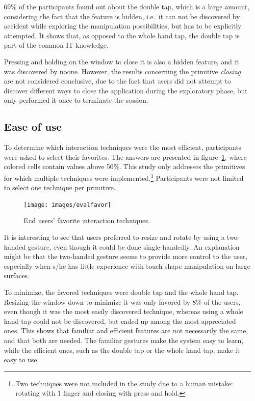 69\% of the participants found out about the double tap, which is a large amount, considering the fact that the feature is hidden, i.e.\ it can not be discovered by accident while exploring the manipulation possibilities, but has to be explicitly attempted.
It shows that, as opposed to the whole hand tap, the double tap is part of the common IT knowledge.

Pressing and holding on the window to close it is also a hidden feature, and it was discovered by noone.
However, the results concerning the primitive \emph{closing} are not considered conclusive, due to the fact that users did not attempt to discover different ways to close the application during the exploratory phase, but only performed it once to terminate the session.

\subsection{Ease of use}

To determine which interaction techniques were the most efficient, participants were asked to select their favorites.
The answers are presented in figure~\ref{fig:evalfavor}, where colored cells contain values above 50\%.
This study only addresses the primitives for which multiple techniques were implemented.\footnote{Two techniques were not included in the study due to a human mistake: rotating with 1 finger and closing with press and hold.}
Participants were not limited to select one technique per primitive.

\begin{figure}[htb]
  \centering
    \texttt{[image: images/evalfavor]}
    \caption{End users' favorite interaction techniques.}
    \label{fig:evalfavor}
\end{figure}

It is interesting to see that users preferred to resize and rotate by using a two-handed gesture, even though it could be done single-handedly.
An explanation might be that the two-handed gesture seems to provide more control to the user, especially when s/he has little experience with touch shape manipulation on large surfaces.

To minimize, the favored techniques were double tap and the whole hand tap.
Resizing the window down to minimize it was only favored by 8\% of the users, even though it was the most easily discovered technique, whereas using a whole hand tap could not be discovered, but ended up among the most appreciated ones.
This shows that familiar and efficient features are not necessarily the same, and that both are needed.
The familiar gestures make the system easy to learn, while the efficient ones, such as the double tap or the whole hand tap, make it easy to use.

